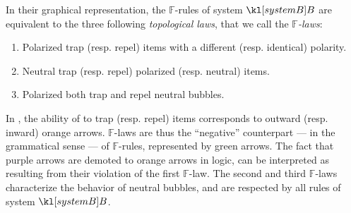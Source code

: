 \begin{description}
  In their graphical representation, the  $\mathbb{F}$-rules of
  system $\sysB$ are equivalent to the three following \emph{topological laws},
  that we call the \emph{$\mathbb{F}$-laws}:
  \begin{fact}
    \sbr
    \begin{enumerate}
      \item Polarized  trap (resp. repel) items with a different (resp.
      identical) polarity.
      \item Neutral  trap (resp. repel) polarized (resp. neutral) items.
      \item Polarized  both trap and repel neutral bubbles.
    \end{enumerate}
  \end{fact}
  In , the ability of  to trap (resp. repel)
  items corresponds to outward (resp. inward) orange arrows. $\mathbb{F}$-laws
  are thus the ``negative'' counterpart --- in the grammatical sense --- of
  $\mathbb{F}$-rules, represented by green arrows. The fact that purple arrows
  are demoted to orange arrows in  logic, can be interpreted as
  resulting from their violation of the first $\mathbb{F}$-law. The second and
  third $\mathbb{F}$-laws characterize the behavior of neutral bubbles, and are
  respected by all rules of system $\sysB$.
  

\end{description}
